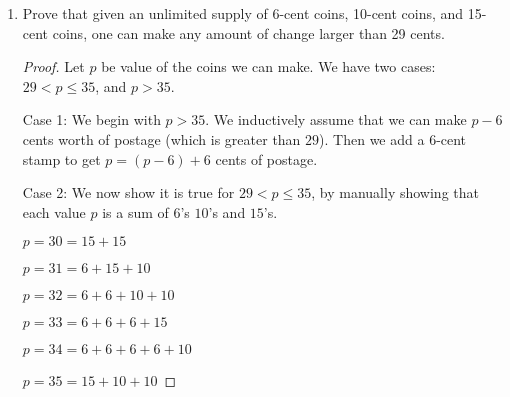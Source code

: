 \documentclass[letterpaper,11pt]{article}
\begin{document}
\begin{enumerate}
\begin{proof}
Inductive step: Assume that $\sum_{i=0}^{k-1}i = \frac{k(k+1)(2k+1)}{6}$. 
\begin{align*}
\sum_{i=0}^{k+1}i^2 &= \sum_{i=0}^{k}i^2 + (k+1)^2&\\
                &= \frac{(k)(k+1)(2k+1)}{6}+ (k+1)^2&\text{I.H.}\\
                &= \frac{(k+1)[(k)(2k+1)6(k+1)^2]}{6}&\\
                &= \frac{(k+1)(2k^2+7k-6)}{6}&\\
                &= \frac{(k+1)(k+2)(2k+3)}{6}.&
\end{align*}
\end{proof}

\newpage

\item Prove that given an unlimited supply of 6-cent coins, 10-cent coins, and 15-cent coins, one can make any amount of change larger than 29 cents.
\begin{proof}
Let $p$ be value of the coins we can make. We have two cases: $29 < p \leq 35$, and $p > 35$.

Case 1: We begin with $p > 35$.
We inductively assume that we can make $p-6$ cents worth of postage (which is greater than $29$). Then we add a $6$-cent stamp to get $p = (p-6) + 6$ cents of postage.

Case 2: We now show it is true for $29 < p \leq 35$, by manually showing that each value $p$ is a sum of $6$'s  $10$'s and $15$'s. 

$p = 30 = 15+ 15$

$p = 31 = 6+15+10$

$p = 32 = 6 + 6 + 10 + 10$

$p = 33 = 6 + 6 + 6 + 15$

$p = 34 = 6 + 6 + 6 + 6 +10$

$p = 35 = 15 + 10 + 10$

\end{proof}
\end{enumerate}
\end{document}
